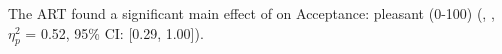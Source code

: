 The ART found a significant main effect of \Phase on Acceptance: pleasant (0-100) (, , $\eta_{p}^{2}$ = 0.52, 95\% CI: [0.29, 1.00]). 
